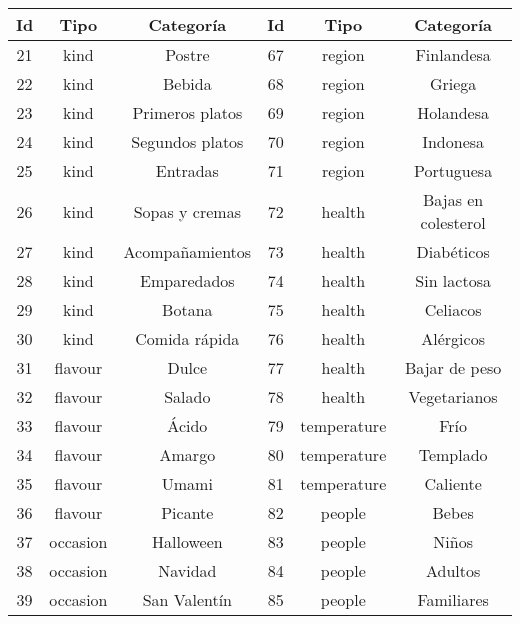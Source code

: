   \begin{table}
    \begin{center}
      \begin{tabular}{ | c | c | c | c | c | c |}
        \toprule
        Id & Tipo & Categoría & Id & Tipo & Categoría\\
        \midrule
        21 & kind  & Postre & 67 & region  & Finlandesa \\
        \midrule
        22 & kind  & Bebida & 68 & region  & Griega \\
        \midrule
        23 & kind  & Primeros platos & 69 & region  & Holandesa \\
        \midrule
        24 & kind  & Segundos platos & 70 & region  & Indonesa \\
        \midrule
        25 & kind  & Entradas & 71 & region  & Portuguesa \\
        \midrule
        26 & kind  & Sopas y cremas & 72 & health  & Bajas en colesterol \\
        \midrule
        27 & kind  & Acompañamientos & 73 & health  & Diabéticos \\
        \midrule
        28 & kind  & Emparedados & 74 & health  & Sin lactosa \\
        \midrule
        29 & kind  & Botana & 75 & health  & Celiacos \\
        \midrule
        30 & kind  & Comida rápida & 76 & health  & Alérgicos \\
        \midrule
        31 & flavour  & Dulce & 77 & health  & Bajar de peso \\
        \midrule
        32 & flavour  & Salado & 78 & health  & Vegetarianos \\
        \midrule
        33 & flavour  & Ácido & 79 & temperature  & Frío \\
        \midrule
        34 & flavour  & Amargo & 80 & temperature  & Templado \\
        \midrule
        35 & flavour  & Umami & 81 & temperature  & Caliente \\
        \midrule
        36 & flavour  & Picante & 82 & people  & Bebes \\
        \midrule
        37 & occasion  & Halloween & 83 & people  & Niños \\
        \midrule
        38 & occasion  & Navidad & 84 & people  & Adultos \\
        \midrule
        39 & occasion  & San Valentín & 85 & people  & Familiares \\

\end{tabular}
\end{center}
\end{table}
